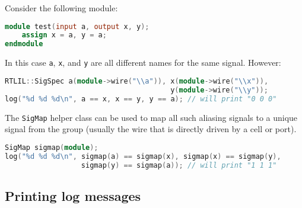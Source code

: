 \begin{frame}[t, fragile]{\subsecname}
Consider the following module:

\smallskip
\begin{lstlisting}[xleftmargin=1cm, basicstyle=\ttfamily\fontsize{8pt}{10pt}\selectfont, language=Verilog]
module test(input a, output x, y);
    assign x = a, y = a;
endmodule
\end{lstlisting}

In this case {\tt a}, {\tt x}, and {\tt y} are all different names for the same signal. However:

\smallskip
\begin{lstlisting}[xleftmargin=1cm, basicstyle=\ttfamily\fontsize{8pt}{10pt}\selectfont, language=C++]
RTLIL::SigSpec a(module->wire("\\a")), x(module->wire("\\x")),
                                       y(module->wire("\\y"));
log("%d %d %d\n", a == x, x == y, y == a); // will print "0 0 0"
\end{lstlisting}

The {\tt SigMap} helper class can be used to map all such aliasing signals to a
unique signal from the group (usually the wire that is directly driven by a cell or port).

\smallskip
\begin{lstlisting}[xleftmargin=1cm, basicstyle=\ttfamily\fontsize{8pt}{10pt}\selectfont, language=C++]
SigMap sigmap(module);
log("%d %d %d\n", sigmap(a) == sigmap(x), sigmap(x) == sigmap(y),
                  sigmap(y) == sigmap(a)); // will print "1 1 1"
\end{lstlisting}
\end{frame}


\subsection{Printing log messages}

